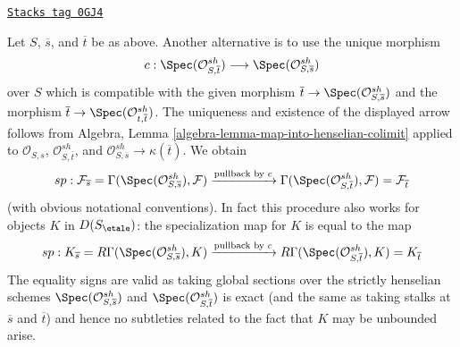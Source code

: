 \begin{remark}

\label{etale-cohomology-remark-another-sp}
\href{https://stacks.math.columbia.edu/tag/0GJ4}{\texttt{Stacks tag 0GJ4}}

Let $S$, $\overline{s}$, and $\overline{t}$ be as above.
Another alternative is to use the unique morphism
$$
c :
\Spec(\mathcal{O}^{sh}_{S, \overline{t}})
\longrightarrow
\Spec(\mathcal{O}^{sh}_{S, \overline{s}})
$$
over $S$ which is compatible with the given morphism
$\overline{t} \to \Spec(\mathcal{O}^{sh}_{S, \overline{s}})$
and the morphism
$\overline{t} \to \Spec(\mathcal{O}^{sh}_{t, \overline{t}})$.
The uniqueness and existence of the displayed arrow
follows from Algebra, Lemma \ref{algebra-lemma-map-into-henselian-colimit}
applied to $\mathcal{O}_{S, s}$, $\mathcal{O}^{sh}_{S, \overline{t}}$, and
$\mathcal{O}^{sh}_{S, \overline{s}} \to \kappa(\overline{t})$.
We obtain
$$
sp :
\mathcal{F}_{\overline{s}} =
\Gamma(\Spec(\mathcal{O}^{sh}_{S, \overline{s}}), \mathcal{F})
\xrightarrow{\text{pullback by }c}
\Gamma(\Spec(\mathcal{O}^{sh}_{S, \overline{t}}), \mathcal{F}) =
\mathcal{F}_{\overline{t}}
$$
(with obvious notational conventions).
In fact this procedure also works for objects $K$ in $D(S_\etale)$:
the specialization map for $K$ is equal to the map
$$
sp :
K_{\overline{s}} =
R\Gamma(\Spec(\mathcal{O}^{sh}_{S, \overline{s}}), K)
\xrightarrow{\text{pullback by }c}
R\Gamma(\Spec(\mathcal{O}^{sh}_{S, \overline{t}}), K) =
K_{\overline{t}}
$$
The equality signs are valid as taking global sections over
the strictly henselian schemes
$\Spec(\mathcal{O}^{sh}_{S, \overline{s}})$ and
$\Spec(\mathcal{O}^{sh}_{S, \overline{t}})$
is exact (and the same as taking stalks at $\overline{s}$ and $\overline{t}$)
and hence no subtleties related to the fact that $K$ may be unbounded
arise.
\end{remark}

